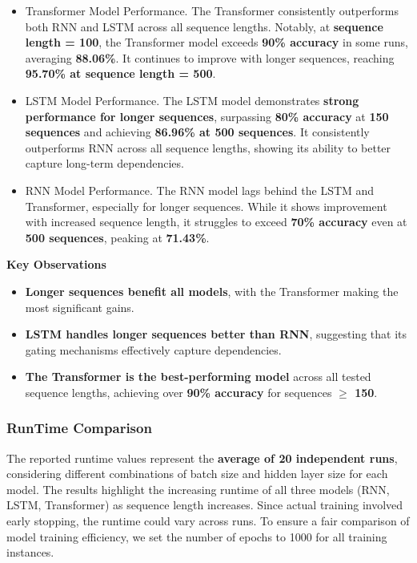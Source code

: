 \documentclass{article}
\begin{document}
\begin{itemize}
    \item Transformer Model Performance. 
    The Transformer consistently outperforms both RNN and LSTM across all sequence lengths. Notably, at \textbf{sequence length = 100}, the Transformer model exceeds \textbf{90\% accuracy} in some runs, averaging \textbf{88.06\%}. It continues to improve with longer sequences, reaching \textbf{95.70\% at sequence length = 500}.
    \item LSTM Model Performance.
    The LSTM model demonstrates \textbf{strong performance for longer sequences}, surpassing \textbf{80\% accuracy} at \textbf{150 sequences} and achieving \textbf{86.96\% at 500 sequences}. It consistently outperforms RNN across all sequence lengths, showing its ability to better capture long-term dependencies.
    \item RNN Model Performance.
    The RNN model lags behind the LSTM and Transformer, especially for longer sequences. While it shows improvement with increased sequence length, it struggles to exceed \textbf{70\% accuracy} even at \textbf{500 sequences}, peaking at \textbf{71.43\%}.
    
    
\end{itemize}

\textbf{Key Observations}
\begin{itemize}
    \item \textbf{Longer sequences benefit all models}, with the Transformer making the most significant gains.
    \item \textbf{LSTM handles longer sequences better than RNN}, suggesting that its gating mechanisms effectively capture dependencies.
    \item \textbf{The Transformer is the best-performing model} across all tested sequence lengths, achieving over \textbf{90\% accuracy} for sequences \textbf{$\geq$ 150}.
\end{itemize}


\subsubsection{RunTime Comparison}

The reported runtime values represent the \textbf{average of 20 independent runs}, considering different combinations of batch size and hidden layer size for each model. The results highlight the increasing runtime of all three models (RNN, LSTM, Transformer) as sequence length increases. Since actual training involved early stopping, the runtime could vary across runs. To ensure a fair comparison of model training efficiency, we set the number of epochs to 1000 for all training instances. 
\end{document}
